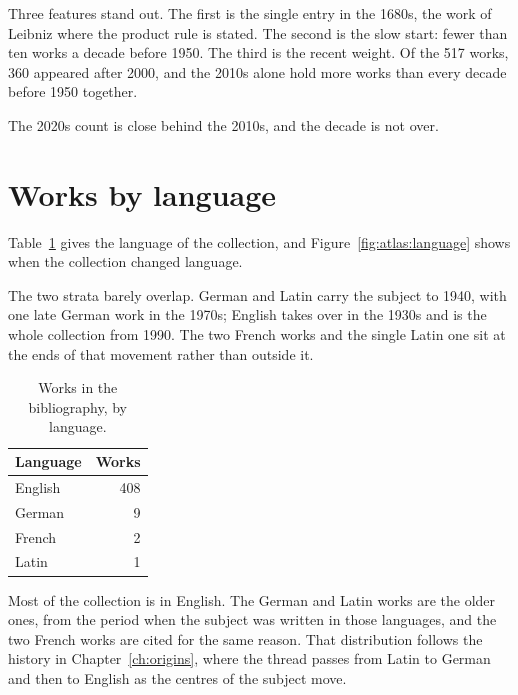 Three features stand out.
The first is the single entry in the 1680s, the work of Leibniz where the
product rule is stated.
The second is the slow start: fewer than ten works a decade before 1950.
The third is the recent weight.
Of the 517 works, 360 appeared after 2000, and the 2010s alone hold more
works than every decade before 1950 together.

The 2020s count is close behind the 2010s, and the decade is not over.

\section{Works by language}

Table~\ref{tab:atlas:language} gives the language of the collection, and
Figure~\ref{fig:atlas:language} shows when the collection changed language.


The two strata barely overlap. German and Latin carry the subject to 1940, with
one late German work in the 1970s; English takes over in the 1930s and is the
whole collection from 1990. The two French works and the single Latin one sit
at the ends of that movement rather than outside it.

\begin{table}[htbp]
  \centering
  \caption{Works in the bibliography, by language.}
  \label{tab:atlas:language}
  \begin{tabular}{lr}
    \toprule
    Language & Works \\
    \midrule
    English & 408 \\
    German  & 9   \\
    French  & 2   \\
    Latin   & 1   \\
    \bottomrule
  \end{tabular}
\end{table}

Most of the collection is in English.
The German and Latin works are the older ones, from the period when the subject
was written in those languages, and the two French works are cited for the same
reason.
That distribution follows the history in Chapter~\ref{ch:origins}, where the
thread passes from Latin to German and then to English as the centres of the
subject move.

